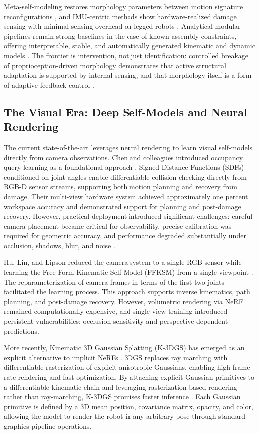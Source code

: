 \documentclass[12pt,a4paper,oneside]{report}
\begin{document}
Meta-self-modeling restores morphology parameters between motion signature reconfigurations \cite{hu2024reconfigurable}, and IMU-centric methods show hardware-realized damage sensing with minimal sensing overhead on legged robots \cite{farghdani2025robust}. Analytical modular pipelines remain strong baselines in the case of known assembly constraints, offering interpretable, stable, and automatically generated kinematic and dynamic models \cite{dogra2022unified}. The frontier is intervention, not just identification: controlled breakage of proprioception-driven morphology demonstrates that active structural adaptation is supported by internal sensing, and that morphology itself is a form of adaptive feedback control \cite{xu2026antenna, yu2026kinematicself}.

\subsection{The Visual Era: Deep Self-Models and Neural Rendering}
The current state-of-the-art leverages neural rendering to learn visual self-models directly from camera observations. Chen and colleagues introduced occupancy query learning as a foundational approach \cite{chen2022full}. Signed Distance Functions (SDFs) conditioned on joint angles enable differentiable collision checking directly from RGB-D sensor streams, supporting both motion planning and recovery from damage. Their multi-view hardware system achieved approximately one percent workspace accuracy and demonstrated support for planning and post-damage recovery. However, practical deployment introduced significant challenges: careful camera placement became critical for observability, precise calibration was required for geometric accuracy, and performance degraded substantially under occlusion, shadows, blur, and noise \cite{chen2022full}.

Hu, Lin, and Lipson reduced the camera system to a single RGB sensor while learning the Free-Form Kinematic Self-Model (FFKSM) from a single viewpoint \cite{hu2024teaching}. The reparameterization of camera frames in terms of the first two joints facilitated the learning process. This approach supports inverse kinematics, path planning, and post-damage recovery. However, volumetric rendering via NeRF remained computationally expensive, and single-view training introduced persistent vulnerabilities: occlusion sensitivity and perspective-dependent predictions.

More recently, Kinematic 3D Gaussian Splatting (K-3DGS) has emerged as an explicit alternative to implicit NeRFs \cite{hu2025learning}. 3DGS replaces ray marching with differentiable rasterization of explicit anisotropic Gaussians, enabling high frame rate rendering and fast optimization. By attaching explicit Gaussian primitives to a differentiable kinematic chain and leveraging rasterization-based rendering rather than ray-marching, K-3DGS promises faster inference \cite{hu2025learning, yu2024shape}. Each Gaussian primitive is defined by a 3D mean position, covariance matrix, opacity, and color, allowing the model to render the robot in any arbitrary pose through standard graphics pipeline operations.
\end{document}
